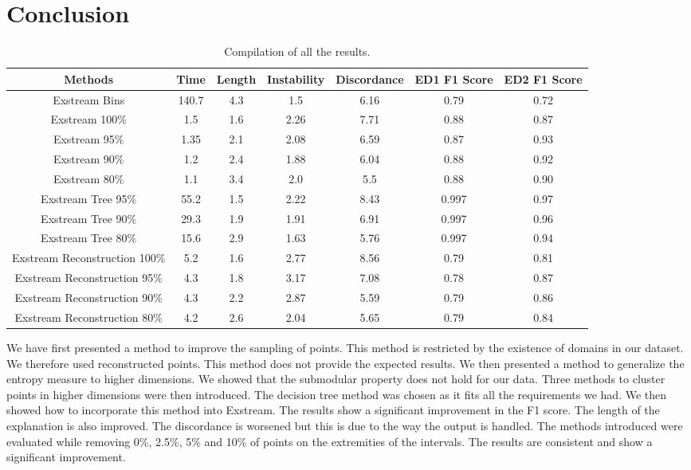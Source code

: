 \documentclass[oneside, a4paper, onecolumn, 11pt]{article}
\begin{document}
\section{Conclusion}
\begin{table}[h]
  \centering
  \begin{tabular}{|c|c|c|c|c|c|c|}
      \hline
      Methods & Time & Length & Instability & Discordance & ED1 F1 Score & ED2 F1 Score\\ 
      \hline
      Exstream Bins  & 140.7  & 4.3  & 1.5  & 6.16 & 0.79 & 0.72 \\
      \hline 
      Exstream 100\%  & 1.5  & 1.6  & 2.26  & 7.71 & 0.88 & 0.87  \\ 
      Exstream 95\%  & 1.35  & 2.1  & 2.08  & 6.59 & 0.87 & 0.93\\ 
      Exstream 90\%  & 1.2  & 2.4  & 1.88  & 6.04 & 0.88 & 0.92\\ 
      Exstream 80\% & 1.1 & 3.4 & 2.0 & 5.5 & 0.88 & 0.90 \\
      \hline
      Exstream Tree 95\%  & 55.2  & 1.5  & 2.22 & 8.43 & 0.997 & 0.97 \\
      Exstream Tree 90\%  & 29.3  & 1.9  & 1.91 & 6.91 & 0.997 & 0.96 \\  
      Exstream Tree 80\%  & 15.6 & 2.9  & 1.63 & 5.76 & 0.997 & 0.94 \\ 
      \hline
      Exstream Reconstruction 100\% & 5.2  & 1.6  & 2.77  & 8.56 & 0.79 & 0.81  \\
      Exstream Reconstruction 95\%  & 4.3  & 1.8  & 3.17 & 7.08 & 0.78 & 0.87\\ 
      Exstream Reconstruction 90\%  & 4.3  & 2.2  & 2.87  & 5.59 & 0.79 & 0.86\\ 
      Exstream Reconstruction 80\% & 4.2 & 2.6 & 2.04 & 5.65 & 0.79 & 0.84 \\ 
      \hline
  \end{tabular}
  \caption{Compilation of all the results.}
  \label{tab:results_tree}
\end{table}
We have first presented a method to improve the sampling of points. This method is restricted by the existence of domains in our dataset. We therefore used reconstructed points. This method does not provide the expected results. We then presented a method to generalize the entropy measure to higher dimensions. We showed that the submodular property does not hold for our data. Three methods to cluster points in higher dimensions were then introduced. The decision tree method was chosen as it fits all the requirements we had. We then showed how to incorporate this method into Exstream. The results show a significant improvement in the F1 score. The length of the explanation is also improved. The discordance is worsened but this is due to the way the output is handled. The methods introduced were evaluated while removing 0\%, 2.5\%, 5\% and 10\% of points on the extremities of the intervals. The results are consistent and show a significant improvement.\\
\end{document}
